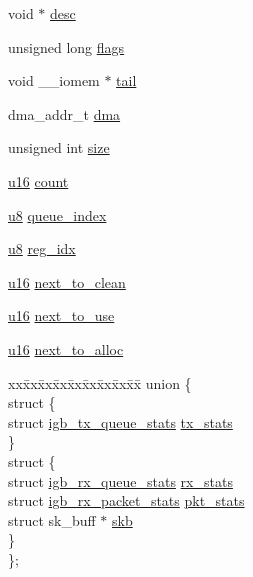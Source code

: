 \begin{DoxyCompactItemize}
\begin{tabbing}
\end{tabbing}\item 
void $\ast$ \hyperlink{structigb__ring_aabab4a57f1bca978579e5878afb257f8}{desc}
\item 
unsigned long \hyperlink{structigb__ring_a9e339c2784bd040b26a5112866700bff}{flags}
\item 
void \+\_\+\+\_\+iomem $\ast$ \hyperlink{structigb__ring_a65a385f7b610d6989dc2ff7204439ab6}{tail}
\item 
dma\+\_\+addr\+\_\+t \hyperlink{structigb__ring_a5624e64f422a13783a01fb56a8e67747}{dma}
\item 
unsigned int \hyperlink{structigb__ring_aac913b3a1f6ef005d66bf7a84428773e}{size}
\item 
\hyperlink{lib_2igb_2e1000__osdep_8h_acdc9cf0314be0ae5a01d6d4379a95edd}{u16} \hyperlink{structigb__ring_a5e12546cd8600448c169facbe4d7d22f}{count}
\item 
\hyperlink{lib_2igb_2e1000__osdep_8h_a8baca7e76da9e0e11ce3a275dd19130c}{u8} \hyperlink{structigb__ring_ae283e590c1d4204ba245b98536a7ebaa}{queue\+\_\+index}
\item 
\hyperlink{lib_2igb_2e1000__osdep_8h_a8baca7e76da9e0e11ce3a275dd19130c}{u8} \hyperlink{structigb__ring_a31161b15f99efdbdd33f601bb0dbab81}{reg\+\_\+idx}
\item 
\hyperlink{lib_2igb_2e1000__osdep_8h_acdc9cf0314be0ae5a01d6d4379a95edd}{u16} \hyperlink{structigb__ring_a2f5b83762c03fc911cd5b870f4ac8b72}{next\+\_\+to\+\_\+clean}
\item 
\hyperlink{lib_2igb_2e1000__osdep_8h_acdc9cf0314be0ae5a01d6d4379a95edd}{u16} \hyperlink{structigb__ring_a2684bbc8d097b888120edb2fb35b00f3}{next\+\_\+to\+\_\+use}
\item 
\hyperlink{lib_2igb_2e1000__osdep_8h_acdc9cf0314be0ae5a01d6d4379a95edd}{u16} \hyperlink{structigb__ring_a0ed19f611cda670eaf9cd246fb6d6c07}{next\+\_\+to\+\_\+alloc}
\item 
\begin{tabbing}
xx\=xx\=xx\=xx\=xx\=xx\=xx\=xx\=xx\=\kill
union \{\\
\>struct \{\\
\>\>struct \hyperlink{structigb__tx__queue__stats}{igb\_tx\_queue\_stats} \hyperlink{structigb__ring_a792fc082f8347a1d1aaa623bbc35ed10}{tx\_stats}\\
\>\} \\
\>struct \{\\
\>\>struct \hyperlink{structigb__rx__queue__stats}{igb\_rx\_queue\_stats} \hyperlink{structigb__ring_a351b28c7fca553ca0c7523d1a9859624}{rx\_stats}\\
\>\>struct \hyperlink{structigb__rx__packet__stats}{igb\_rx\_packet\_stats} \hyperlink{structigb__ring_a2e15daa5af2b0e45c95d5f2573a96815}{pkt\_stats}\\
\>\>struct sk\_buff $\ast$ \hyperlink{structigb__ring_aeba6836824708325a83121030f092c30}{skb}\\
\>\} \\
\}; \\

\end{tabbing}\end{DoxyCompactItemize}


